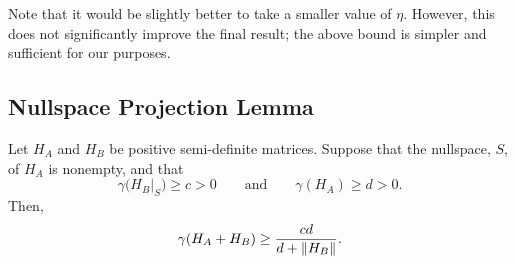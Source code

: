 \documentclass[../thesis-main/thesis-main]{subfiles}
\begin{document}
Note that it would be slightly better to take a smaller value of $\eta$.  However, this does not significantly improve the final result; the above bound is simpler and sufficient for our purposes.


\subsection{Nullspace Projection Lemma}

\begin{lemma}
Let $H_A$ and $H_B$ be positive semi-definite matrices.  Suppose that the nullspace, $S$, of $H_A$ is nonempty, and that 
\begin{equation}
  \gamma\big(H_B|_S\big) \geq c > 0 \qquad \text{and} \qquad \gamma(H_A) \geq d > 0.
\end{equation}
Then,
\begin{equation}
  \gamma(H_A + H_B) \geq \frac{c d}{d + \|{H_B}\|} .
\end{equation}
\end{lemma}
\end{document}
